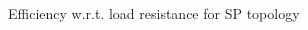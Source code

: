 
\begin{figure}[h]
\centering
\begin{subfigmatrix}{2} 
\end{subfigmatrix}
\end{figure}
\begin{figure}[H]
\centering
\begin{subfigmatrix}{1} 
\end{subfigmatrix}
\caption{Efficiency w.r.t. load resistance for SP topology}
\end{figure}

